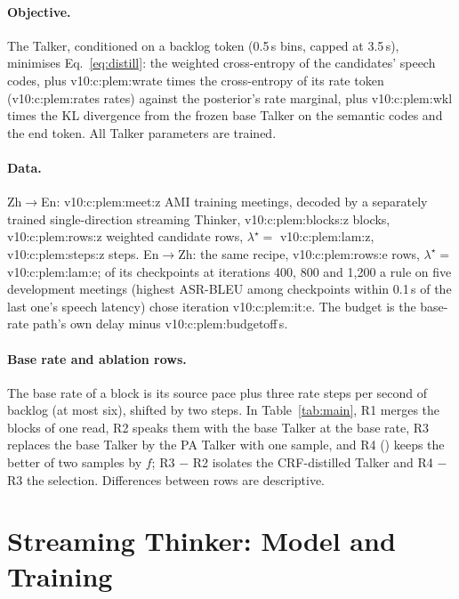 \paragraph{Objective.} The Talker, conditioned on a backlog token (0.5\,s bins, capped at 3.5\,s), minimises
Eq.~\eqref{eq:distill}: the weighted cross-entropy of the candidates' speech codes, plus \num{v10:c:plem:wrate} times the
cross-entropy of its rate token (\num{v10:c:plem:rates} rates) against the posterior's rate marginal, plus
\num{v10:c:plem:wkl} times the KL divergence from the frozen base Talker on the semantic codes and the end token. All
Talker parameters are trained.

\paragraph{Data.} Zh$\rightarrow$En: \num{v10:c:plem:meet:z} AMI training meetings, decoded by a separately trained
single-direction streaming Thinker, \num{v10:c:plem:blocks:z} blocks, \num{v10:c:plem:rows:z} weighted candidate rows,
$\lambda^\star=$ \num{v10:c:plem:lam:z}, \num{v10:c:plem:steps:z} steps. En$\rightarrow$Zh: the same recipe,
\num{v10:c:plem:rows:e} rows, $\lambda^\star=$ \num{v10:c:plem:lam:e}; of its checkpoints at iterations 400, 800 and
1{,}200 a rule on five development meetings (highest ASR-BLEU among checkpoints within 0.1\,s of the last one's speech
latency) chose iteration \num{v10:c:plem:it:e}. The budget is the base-rate path's own delay minus
\num{v10:c:plem:budgetoff}\,s.

\paragraph{Base rate and ablation rows.} The base rate of a block is its source pace plus three rate steps per second
of backlog (at most six), shifted by two steps. In Table~\ref{tab:main}, R1 merges the blocks of one read, R2 speaks
them with the base Talker at the base rate, R3 replaces the base Talker by the PA Talker with one sample, and R4
(\sys{}) keeps the better of two samples by $f$; R3 $-$ R2 isolates the CRF-distilled Talker and R4 $-$ R3 the
selection. Differences between rows are descriptive.

\section{Streaming Thinker: Model and Training}
\label{app:model}
\label{app:train}
\label{app:causal}
\label{app:prompt}

